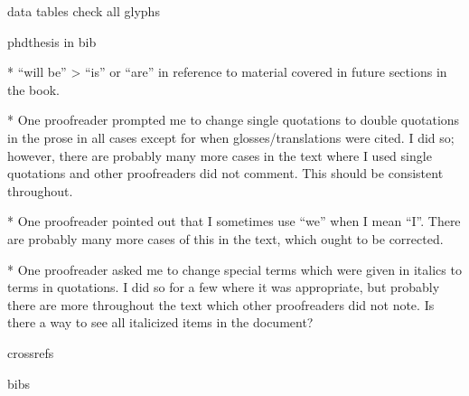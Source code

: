 data 
tables
check all glyphs  

phdthesis in bib
 
  
  *   “will be” > “is” or “are” in reference to material covered in future sections in the book.
  
  * One proofreader prompted me to change single quotations to double quotations in the prose in all cases except for when glosses/translations were cited. I did so; however, there are probably many more cases in the text where I used single quotations and other proofreaders did not comment. This should be consistent throughout.

  *   One proofreader pointed out that I sometimes use “we” when I mean “I”. There are probably many more cases of this in the text, which ought to be corrected.
  
  *   One proofreader asked me to change special terms which were given in italics to terms in quotations. I did so for a few where it was appropriate, but probably there are more throughout the text which other proofreaders did not note. Is there a way to see all italicized items in the document?
  
  crossrefs
  
  bibs
  
  
